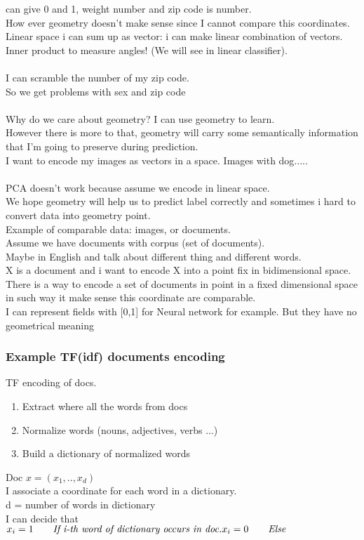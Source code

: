 \documentclass[../main.tex]{subfiles}
\begin{document}
can give 0 and 1, weight number and zip code is number.\\
How ever geometry doesn’t make sense since I cannot compare this
coordinates.\\
Linear space i can sum up as vector: i can make linear combination of
vectors.\\
Inner product to measure angles! (We will see in linear classifier).\\\\
I can scramble the number of my zip code.\\
So we get problems with sex and zip code\\\\
Why do we care about geometry? I can use geometry to learn.\\
However there is more to that, geometry will carry some semantically
information that I’m going to preserve during prediction.\\
I want to encode my images as vectors in a space. Images with dog.....\\\\
PCA doesn’t work because assume we encode in linear space.\\
We hope geometry will help us to predict label correctly and sometimes i hard
to convert data into geometry point.\\
Example of comparable data: images, or documents. \\
Assume we have documents with corpus (set of documents).\\
Maybe in English and talk about different thing and different words.\\
X is a document and i want to encode X into a point fix in bidimensional
space.\\
There is a way to encode a set of documents in point in a fixed dimensional
space in such way it make sense this coordinate are comparable.\\
I can represent fields with [0,1] for Neural network for example. But they have no geometrical meaning\\

\subsubsection{Example TF(idf) documents encoding} 
TF encoding of docs.
\begin{enumerate}
\item Extract where all the words from docs
\item Normalize words (nouns, adjectives, verbs ...)
\item Build a dictionary of normalized words
\end{enumerate}
Doc $x = (x_1, .., x_d) $\\
I associate a coordinate for each word in a dictionary.\\
d = number of words in dictionary\\
I can decide that \\
$x_i = 1 \qquad \textit{If i-th word of dictionary occurs in doc.}\\
 x_i = 0 \qquad \textit{Else} 
$\\
\end{document}
